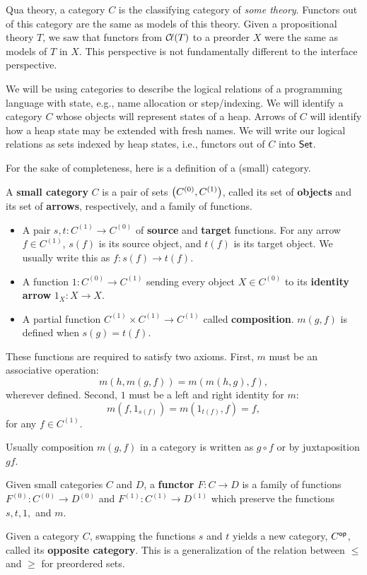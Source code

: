 \documentclass[../main.tex]{subfiles}
\begin{document}
Qua theory, a category \(C\) is the classifying category of
\emph{some theory}. Functors out of this category are the same as models of this
theory. Given a propositional theory \(T\), we saw that functors from \({\mathcal{C}\kern-.15em\ell}(T)\)
to a preorder \(X\) were the same as models of \(T\) in \(X\). This perspective
is not fundamentally different to the interface perspective.

We will be using categories to describe the logical relations of a programming
language with state, e.g., name allocation or step\-/indexing. We will identify
a category \(C\) whose objects will represent states of a heap. Arrows of \(C\)
will identify how a heap state may be extended with fresh names. We will write
our logical relations as sets indexed by heap states, i.e., functors out of
\(C\) into \({\mathsf{Set}}\).

For the sake of completeness, here is a definition of a (small) category.
\begin{definition}
  A \textbf{small category} \(C\) is a pair of sets \({\left(C^{(0)},
    C^{(1)}\right)}\), called its set of \textbf{objects} and its set of
  \textbf{arrows}, respectively, and a family of functions.
  \begin{itemize}
  \item A pair \(s,t : C^{(1)} \to C^{(0)}\) of \textbf{source} and
    \textbf{target} functions. For any arrow \(f \in C^{(1)}\), \(s(f)\) is its
    source object, and \(t(f)\) is its target object. We usually write this as
    \(f : s(f) \to t(f)\).
  \item A function \(1: C^{(0)} \to C^{(1)}\) sending every object \(X \in
    C^{(0)}\) to its \textbf{identity arrow} \(1_X : X \to X\).
  \item A partial function \(C^{(1)} \times C^{(1)} \to C^{(1)}\) called
    \textbf{composition}. \(m(g,f)\) is defined when \(s(g) = t(f)\).
  \end{itemize}
  These functions are required to satisfy two axioms. First, \(m\) must be an
  associative operation:
  \[%
    m(h,m(g,f)) = m(m(h,g),f),
  \]%
  wherever defined. Second, \(1\) must be a left and right identity for \(m\):
  \[%
    m(f,1_{s(f)}) = m(1_{t(f)}, f) = f,
  \]%
  for any \(f \in C^{(1)}\).
\end{definition}
Usually composition \(m(g,f)\) in a category is written as \(g\circ f\) or by
juxtaposition \(gf\).
\begin{definition}
  Given small categories \(C\) and \(D\), a \textbf{functor} \(F: C \to D\) is a
  family of functions \(F^{(0)} : C^{(0)} \to D^{(0)}\) and \(F^{(1)} : C^{(1)}
  \to D^{(1)}\) which preserve the functions \(s,t,1,\) and \(m\).
\end{definition}
Given a category \(C\), swapping the functions \(s\) and \(t\) yields a new
category, \(C^{\mathsf{op}}\), called its \textbf{opposite category}. This is a
generalization of the relation between \(\leq\) and \(\geq\) for preordered
sets.
\end{document}
